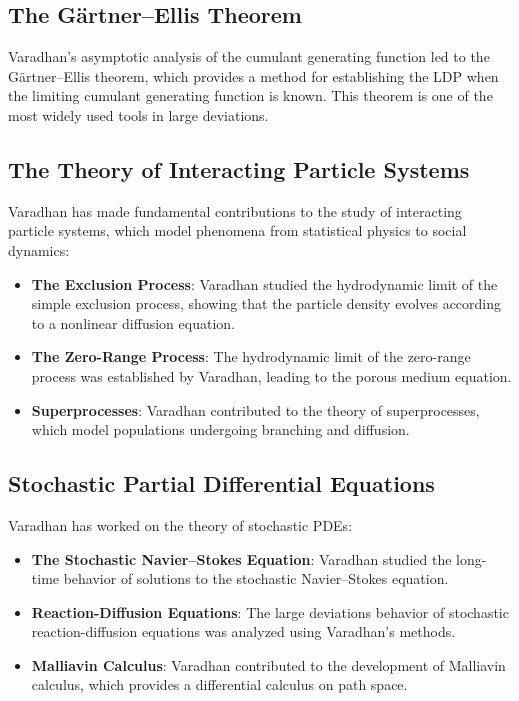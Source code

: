 \subsection{The G\"artner--Ellis Theorem}

Varadhan's asymptotic analysis of the cumulant generating function led to the G\"artner--Ellis theorem, which provides a method for establishing the LDP when the limiting cumulant generating function is known. This theorem is one of the most widely used tools in large deviations.

\subsection{The Theory of Interacting Particle Systems}

Varadhan has made fundamental contributions to the study of interacting particle systems, which model phenomena from statistical physics to social dynamics:

\begin{itemize}
\item \textbf{The Exclusion Process}: Varadhan studied the hydrodynamic limit of the simple exclusion process, showing that the particle density evolves according to a nonlinear diffusion equation.

\item \textbf{The Zero-Range Process}: The hydrodynamic limit of the zero-range process was established by Varadhan, leading to the porous medium equation.

\item \textbf{Superprocesses}: Varadhan contributed to the theory of superprocesses, which model populations undergoing branching and diffusion.
\end{itemize}

\subsection{Stochastic Partial Differential Equations}

Varadhan has worked on the theory of stochastic PDEs:

\begin{itemize}
\item \textbf{The Stochastic Navier--Stokes Equation}: Varadhan studied the long-time behavior of solutions to the stochastic Navier--Stokes equation.

\item \textbf{Reaction-Diffusion Equations}: The large deviations behavior of stochastic reaction-diffusion equations was analyzed using Varadhan's methods.

\item \textbf{Malliavin Calculus}: Varadhan contributed to the development of Malliavin calculus, which provides a differential calculus on path space.
\end{itemize}

